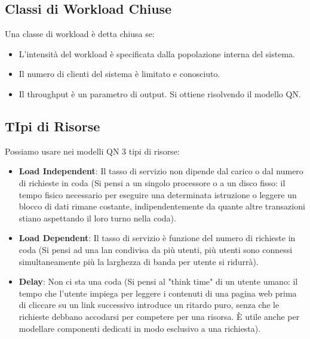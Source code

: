 \documentclass[11pt,a4paper]{article}
\begin{document}
    \subsection{Classi di Workload Chiuse}
    Una classe di workload è detta chiusa se:
    \begin{itemize}
        \item L'intensità del workload è specificata dalla popolazione interna del sistema.
        \item Il numero di clienti del sistema è limitato e conosciuto.
        \item Il throughput è un parametro di output. Si ottiene risolvendo il modello QN.
    \end{itemize}

    \subsection{TIpi di Risorse}
    Possiamo usare nei modelli QN 3 tipi di risorse:
    \begin{itemize}
    \item \textbf{Load Independent}: Il tasso di servizio non dipende dal carico o dal numero di richieste in coda (Si pensi a un singolo processore o a un disco fisso: il tempo fisico necessario per eseguire una determinata istruzione o leggere un blocco di dati rimane costante, indipendentemente da quante altre transazioni stiano aspettando il loro turno nella coda).
    \item \textbf{Load Dependent}: Il tasso di servizio è funzione del numero di richieste in coda (Si pensi ad una lan condivisa da più utenti, più utenti sono connessi simultaneamente più la larghezza di banda per utente si ridurrà).
    \item \textbf{Delay}: Non ci sta una coda (Si pensi al "think time" di un utente umano: il tempo che l'utente impiega per leggere i contenuti di una pagina web prima di cliccare su un link successivo introduce un ritardo puro, senza che le richieste debbano accodarsi per competere per una risorsa. È utile anche per modellare componenti dedicati in modo esclusivo a una richiesta).
    \end{itemize}
\end{document}
